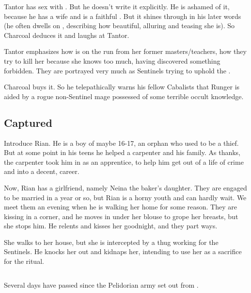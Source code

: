 Tantor has sex with \Takestsha. But he doesn't write it explicitly. He is ashamed of it, because he has a wife and is a faithful \Iquinian. But it shines through in his later words (he often dwells on \Takestsha, describing how beautiful, alluring and teasing she is). So Charcoal deduces it and laughs at Tantor. 

Tantor emphasizes how \Takestsha{} is on the run from her former masters/teachers, how they try to kill her because she knows too much, having discovered something forbidden. They are portrayed very much as Sentinels trying to uphold the \charade. 

Charcoal buys it. So he telepathically warns his fellow Cabalists that Runger is aided by a rogue non-Sentinel mage possessed of some terrible occult knowledge. 









\subsection{Captured}
Introduce Rian. He is a \Malcurian boy of maybe 16-17, an orphan who used to be a thief. But at some point in his teens he helped a carpenter and his family. As thanks, the carpenter took him in as an apprentice, to help him get out of a life of crime and into a decent, \honourable career. 

Now, Rian has a girlfriend, namely Neina the baker's daughter. They are engaged to be married in a year or so, but Rian is a horny youth and can hardly wait. We meet them an evening when he is walking her home for some reason. They are kissing in a corner, and he moves in under her blouse to grope her breasts, but she stops him. He relents and kisses her goodnight, and they part ways. 

She walks to her house, but she is intercepted by a thug working for the Sentinels. He knocks her out and kidnaps her, intending to use her as a sacrifice for the \Nithdornazsh{} ritual. 







\subsection{\Forclin}
Several days have passed since the Pelidorian army set out from \Malcur. 

